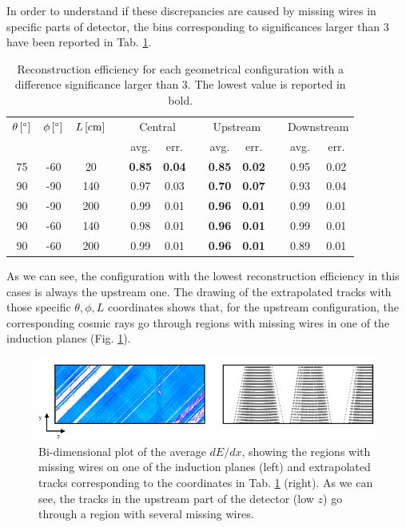 \documentclass[a4paper]{scrartcl}
\begin{document}
In order to understand if these discrepancies are caused by missing wires in specific parts of detector, the bins corresponding to significances larger than 3 have been reported in Tab. \ref{tab:significance}.

\begin{table}[htbp]
  \centering
  \begin{tabular}{cccccccccccc}
    \toprule
    $\theta\thinspace[^\circ]$ & $\phi\thinspace[^\circ]$ & $L\thinspace[\mathrm{cm}]$ & \phantom{a} & \multicolumn{2}{c}{Central} & \phantom{a} & \multicolumn{2}{c}{Upstream} & \phantom{a} & \multicolumn{2}{c}{Downstream}\\
     \cmidrule{5-6} \cmidrule{8-9} \cmidrule{11-12}
      &  &  & & avg. & err. & & avg. & err. & & avg. & err.   \\
    \midrule
    75 & -60 & 20 & & \textbf{0.85} & \textbf{0.04} & & \textbf{0.85} & \textbf{0.02} & & 0.95 & 0.02\\
    90 & -90 & 140 & & 0.97 & 0.03 & & \textbf{0.70} & \textbf{0.07} & & 0.93 & 0.04\\
    90 & -90 & 200 & & 0.99 & 0.01 & & \textbf{0.96} & \textbf{0.01} & & 0.99 & 0.01\\
    90 & -60 & 140 & & 0.98 & 0.01 & & \textbf{0.96} & \textbf{0.01} & & 0.99 & 0.01\\
    90 & -60 & 200 & & 0.99 & 0.01 & & \textbf{0.96} & \textbf{0.01} & & 0.89 & 0.01\\

    \bottomrule
  \end{tabular}
  \caption{Reconstruction efficiency for each geometrical configuration with a difference significance larger than 3. The lowest value is reported in bold.}\label{tab:significance}
\end{table}

As we can see, the configuration with the lowest reconstruction efficiency in this cases is always the upstream one. The drawing of the extrapolated tracks with those specific $\theta,\phi,L$ coordinates shows that, for the upstream configuration, the corresponding cosmic rays go through regions with missing wires in one of the induction planes (Fig. \ref{fig:wires}).

\begin{figure}[htbp]
  \begin{center}
    \includegraphics[width=1\linewidth]{figures/wire_tracks.png}
    \caption{Bi-dimensional plot of the average $dE/dx$, showing the regions with missing wires on one of the induction planes (left) and extrapolated tracks corresponding to the coordinates in Tab. \ref{tab:significance} (right). As we can see, the tracks in the upstream part of the detector (low $z$) go through a region with several missing wires.} \label{fig:wires}
  \end{center}
\end{figure}
\end{document}
